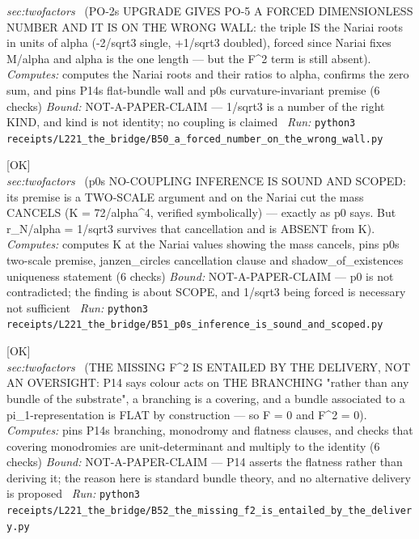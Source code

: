 \begin{description}
\textit{sec:twofactors} \ (PO-2s UPGRADE GIVES PO-5 A FORCED DIMENSIONLESS NUMBER AND IT IS ON THE WRONG WALL: the triple IS the Nariai roots in units of alpha (-2/sqrt3 single, +1/sqrt3 doubled), forced since Nariai fixes M/alpha and alpha is the one length --- but the F\textasciicircum{}2 term is still absent). 
\emph{Computes:} computes the Nariai roots and their ratios to alpha, confirms the zero sum, and pins P14s flat-bundle wall and p0s curvature-invariant premise (6 checks)
 \emph{Bound:} NOT-A-PAPER-CLAIM --- 1/sqrt3 is a number of the right KIND, and kind is not identity; no coupling is claimed
\ \emph{Run:} \texttt{python3 receipts/L221\_the\_bridge/B50\_a\_forced\_number\_on\_the\_wrong\_wall.py}
\item[\label{rcpt:B51_p0s_inference_is_sound_and_scoped}\texttt{B51\_p0s\_inference\_is\_sound\_and\_scoped}]\hfill\textsf{[OK]}\\
\textit{sec:twofactors} \ (p0s NO-COUPLING INFERENCE IS SOUND AND SCOPED: its premise is a TWO-SCALE argument and on the Nariai cut the mass CANCELS (K = 72/alpha\textasciicircum{}4, verified symbolically) --- exactly as p0 says. But r\_N/alpha = 1/sqrt3 survives that cancellation and is ABSENT from K). 
\emph{Computes:} computes K at the Nariai values showing the mass cancels, pins p0s two-scale premise, janzen\_circles cancellation clause and shadow\_of\_existences uniqueness statement (6 checks)
 \emph{Bound:} NOT-A-PAPER-CLAIM --- p0 is not contradicted; the finding is about SCOPE, and 1/sqrt3 being forced is necessary not sufficient
\ \emph{Run:} \texttt{python3 receipts/L221\_the\_bridge/B51\_p0s\_inference\_is\_sound\_and\_scoped.py}
\item[\label{rcpt:B52_the_missing_f2_is_entailed_by_the_delivery}\texttt{B52\_the\_missing\_f2\_is\_entailed\_by\_the\_delivery}]\hfill\textsf{[OK]}\\
\textit{sec:twofactors} \ (THE MISSING F\textasciicircum{}2 IS ENTAILED BY THE DELIVERY, NOT AN OVERSIGHT: P14 says colour acts on THE BRANCHING "rather than any bundle of the substrate", a branching is a covering, and a bundle associated to a pi\_1-representation is FLAT by construction --- so F = 0 and F\textasciicircum{}2 = 0). 
\emph{Computes:} pins P14s branching, monodromy and flatness clauses, and checks that covering monodromies are unit-determinant and multiply to the identity (6 checks)
 \emph{Bound:} NOT-A-PAPER-CLAIM --- P14 asserts the flatness rather than deriving it; the reason here is standard bundle theory, and no alternative delivery is proposed
\ \emph{Run:} \texttt{python3 receipts/L221\_the\_bridge/B52\_the\_missing\_f2\_is\_entailed\_by\_the\_delivery.py}

\end{description}
